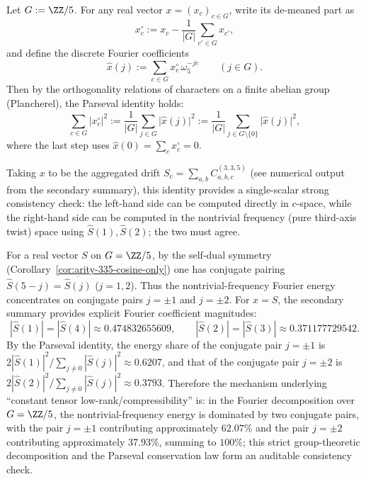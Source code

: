 \begin{remark}\label{rem:arity-335-parseval-bias}
Let \(G:=\ZZ/5\).
For any real vector \(x=(x_c)_{c\in G}\), write its de-meaned part as
\[
x_c^\circ:=x_c-\frac{1}{|G|}\sum_{c'\in G}x_{c'},
\]
and define the discrete Fourier coefficients
\[
\widehat x(j):=\sum_{c\in G}x_c^\circ\,\omega_5^{-jc}\qquad(j\in G).
\]
Then by the orthogonality relations of characters on a finite abelian group (Plancherel), the Parseval identity holds:
\[
\sum_{c\in G}\bigl|x_c^\circ\bigr|^2
:=\frac{1}{|G|}\sum_{j\in G}\bigl|\widehat x(j)\bigr|^2
:=\frac{1}{|G|}\sum_{j\in G\setminus\{0\}}\bigl|\widehat x(j)\bigr|^2,
\]
where the last step uses \(\widehat x(0)=\sum_c x_c^\circ=0\).
\par
Taking \(x\) to be the aggregated drift \(S_c=\sum_{a,b}C^{(3,3,5)}_{a,b,c}\) (see numerical output from the secondary summary), this identity provides a single-scalar strong consistency check: the left-hand side can be computed directly in \(c\)-space, while the right-hand side can be computed in the nontrivial frequency (pure third-axis twist) space using \(\widehat S(1),\widehat S(2)\); the two must agree.
\par
For a real vector \(S\) on \(G=\ZZ/5\), by the self-dual symmetry (Corollary~\ref{cor:arity-335-cosine-only}) one has conjugate pairing \(\widehat S(5-j)=\overline{\widehat S(j)}\) (\(j=1,2\)). Thus the nontrivial-frequency Fourier energy concentrates on conjugate pairs \(j=\pm 1\) and \(j=\pm 2\). For \(x=S\), the secondary summary provides explicit Fourier coefficient magnitudes:
\[
|\widehat S(1)|=|\widehat S(4)|\approx 0.474832655609,\qquad |\widehat S(2)|=|\widehat S(3)|\approx 0.371177729542.
\]
By the Parseval identity, the energy share of the conjugate pair \(j=\pm 1\) is \(2|\widehat S(1)|^2/\sum_{j\neq 0}|\widehat S(j)|^2\approx 0.6207\), and that of the conjugate pair \(j=\pm 2\) is \(2|\widehat S(2)|^2/\sum_{j\neq 0}|\widehat S(j)|^2\approx 0.3793\). Therefore the mechanism underlying ``constant tensor low-rank/compressibility'' is: in the Fourier decomposition over \(G=\ZZ/5\), the nontrivial-frequency energy is dominated by two conjugate pairs, with the pair \(j=\pm 1\) contributing approximately \(62.07\%\) and the pair \(j=\pm 2\) contributing approximately \(37.93\%\), summing to \(100\%\); this strict group-theoretic decomposition and the Parseval conservation law form an auditable consistency check.
\end{remark}

